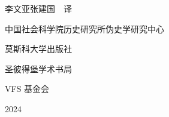 \vspace{11mm}

{\large 李\quad 文\quad 亚\qquad 张\quad 建\quad 国\ \ 译\par}
\vspace{2mm}
{\small\color{graphite} 中国社会科学院历史研究所伪史学研究中心\par}

\vfill

{\small\sffamily 莫斯科大学出版社\par}
{\small\sffamily 圣彼得堡学术书局\par}
{\small\sffamily VFS 基金会\par}
\vspace{3mm}
{\footnotesize 2024\par}
\endgroup
\clearpage

\thispagestyle{empty}
\begingroup
\footnotesize
\linespread{1.22}\selectfont
\centering
